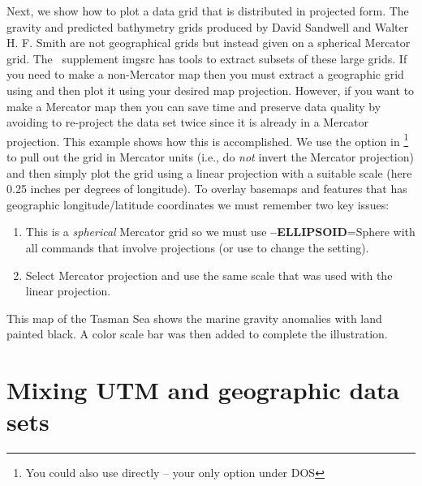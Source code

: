 Next, we show how to plot a data grid that is distributed in projected form.  The gravity and
predicted bathymetry grids produced by David Sandwell and Walter H. F. Smith are not geographical
grids but instead given on a spherical Mercator grid.  The \GMT\ supplement imgsrc has tools to
extract subsets of these large grids.  If you need to make a non-Mercator map then you must extract
a geographic grid using  and then plot it using your desired map projection.
However, if you want to make a Mercator map then you can save time and preserve data quality by
avoiding to re-project the data set twice since it is already in a Mercator projection.  This example
shows how this is accomplished.  We use the  option in \footnote{You could
also use  directly -- your only option under DOS} to pull out the
grid in Mercator units (i.e., do \emph{not} invert the Mercator projection) and then simply plot the
grid using a linear projection with a suitable scale (here 0.25 inches per degrees of longitude).
To overlay basemaps and features that has geographic longitude/latitude coordinates we must remember
two key issues:
\begin{enumerate}
	\item This is a \emph{spherical} Mercator grid so we must use {\bf --ELLIPSOID}=Sphere with all
	commands that involve projections (or use  to change the setting).
	\item Select Mercator projection and use the same scale that was used with the linear projection.
\end{enumerate}


This map of the Tasman Sea shows the marine gravity anomalies with land painted black.  A color scale bar
was then added to complete the illustration.

 


\section{Mixing UTM and geographic data sets}

